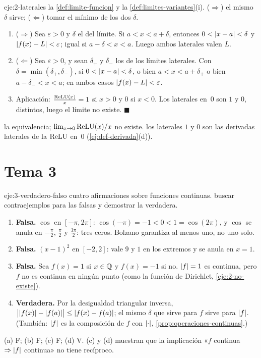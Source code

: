 \begin{solucion}{eje:2-laterales}
\datos la \cref{def:limite-funcion} y la \cref{def:limites-variantes}(i).
\planteamiento ($\Rightarrow$) el mismo $\delta$ sirve; ($\Leftarrow$) tomar el mínimo de los dos $\delta$.
\pasos
\begin{enumerate}[label=\arabic*.]
  \item ($\Rightarrow$) Sea $\varepsilon>0$ y $\delta$ el del límite. Si $a<x<a+\delta$, entonces $0<\lvert x-a\rvert<\delta$ y $\lvert f(x)-L\rvert<\varepsilon$; igual si $a-\delta<x<a$. Luego ambos laterales valen $L$.
  \item ($\Leftarrow$) Sea $\varepsilon>0$, y sean $\delta_{+}$ y $\delta_{-}$ los de los límites laterales. Con $\delta=\min(\delta_{+},\delta_{-})$, si $0<\lvert x-a\rvert<\delta$, o bien $a<x<a+\delta_{+}$ o bien $a-\delta_{-}<x<a$; en ambos casos $\lvert f(x)-L\rvert<\varepsilon$.
  \item Aplicación: $\frac{\operatorname{ReLU}(x)}{x}=1$ si $x>0$ y $0$ si $x<0$. Los laterales en~0 son $1$ y $0$, distintos, luego el límite no existe. \hfill$\blacksquare$
\end{enumerate}
\resultado la equivalencia; $\lim_{x\to0}\operatorname{ReLU}(x)/x$ no existe.
\comprobacion los laterales $1$ y $0$ son las derivadas laterales de la $\operatorname{ReLU}$ en~0 (\cref{ej:def-derivada}(d)).
\end{solucion}
\section{Tema 3}

\begin{solucion}{eje:3-verdadero-falso}
\datos cuatro afirmaciones sobre funciones continuas.
\planteamiento buscar contraejemplos para las falsas y demostrar la verdadera.
\pasos
\begin{enumerate}[label=(\alph*)]
  \item \textbf{Falsa.} $\cos$ en $[-\pi,2\pi]$: $\cos(-\pi)=-1<0<1=\cos(2\pi)$, y $\cos$ se anula en $-\frac\pi2$, $\frac\pi2$ y $\frac{3\pi}{2}$: tres ceros. Bolzano garantiza al menos uno, no uno solo.
  \item \textbf{Falsa.} $(x-1)^{2}$ en $[-2,2]$: vale $9$ y $1$ en los extremos y se anula en $x=1$.
  \item \textbf{Falsa.} Sea $f(x)=1$ si $x\in\mathbb{Q}$ y $f(x)=-1$ si no. $\lvert f\rvert=1$ es continua, pero $f$ no es continua en ningún punto (como la función de Dirichlet, \cref{eje:2-no-existe}).
  \item \textbf{Verdadera.} Por la desigualdad triangular inversa, $\bigl|\lvert f(x)\rvert-\lvert f(a)\rvert\bigr|\le\lvert f(x)-f(a)\rvert$; el mismo $\delta$ que sirve para $f$ sirve para $\lvert f\rvert$. (También: $\lvert f\rvert$ es la composición de $f$ con $\lvert\cdot\rvert$, \cref{prop:operaciones-continuas}.)
\end{enumerate}
\resultado (a) F; (b) F; (c) F; (d) V.
\comprobacion (c) y (d) muestran que la implicación «$f$ continua $\Rightarrow\lvert f\rvert$ continua» no tiene recíproco.
\end{solucion}


